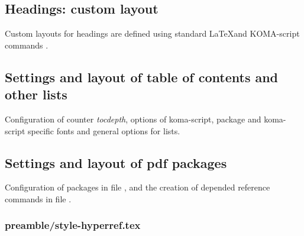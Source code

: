 \subsection{Headings: custom layout}
\label{sec:style:headings:custom}

Custom layouts for headings are defined using standard \LaTeX and KOMA-script commands .


%
%

\subsection{Settings and layout of table of contents and other lists}
\label{sec:style:toc}

Configuration of counter \emph{tocdepth}, options of koma-script, package  and koma-script specific fonts and general options for lists.


\subsection{Settings and layout of pdf packages}
\label{sec:style:pdf}

Configuration of packages  in file ,  and the creation of  depended reference commands in file .


\subsubsection{preamble/style-hyperref.tex}

